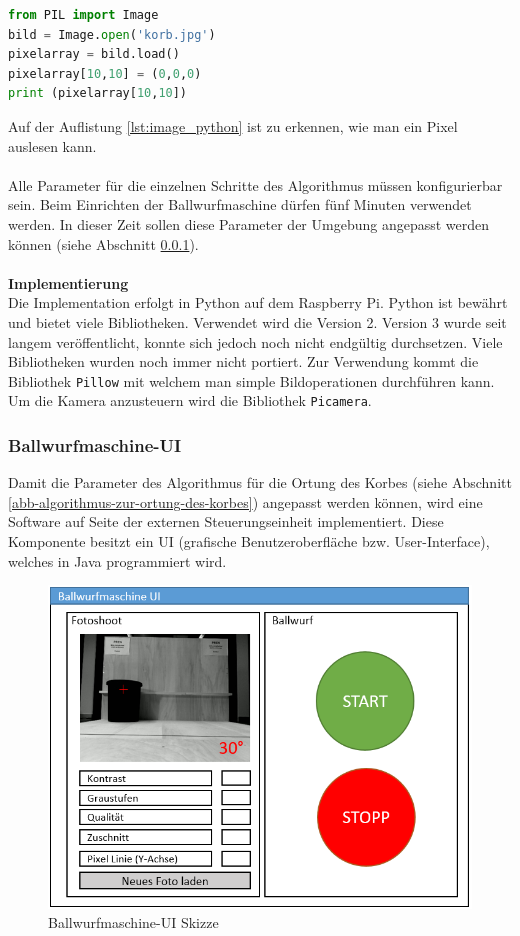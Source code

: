 \begin{lstlisting}[language=Python,caption={Pixel aus einem Bild auslesen mit Python},label=lst:image_python]
from PIL import Image
bild = Image.open('korb.jpg')
pixelarray = bild.load()
pixelarray[10,10] = (0,0,0)
print (pixelarray[10,10])
\end{lstlisting}

Auf der Auflistung \ref{lst:image_python} ist zu erkennen, wie man ein Pixel auslesen kann.\\
\\
Alle Parameter für die einzelnen Schritte des Algorithmus müssen konfigurierbar sein. Beim Einrichten der Ballwurfmaschine dürfen fünf Minuten verwendet werden. In dieser Zeit sollen diese Parameter der Umgebung angepasst werden können (siehe Abschnitt \ref{ss-config-paramater-ortung-orb}).\\
\\
\textbf{Implementierung}\\
Die Implementation erfolgt in Python auf dem Raspberry Pi. Python ist bewährt und bietet viele Bibliotheken. Verwendet wird die Version 2. Version 3 wurde seit langem veröffentlicht, konnte sich jedoch noch nicht endgültig durchsetzen. Viele Bibliotheken wurden noch immer nicht portiert. Zur Verwendung kommt die Bibliothek \verb|Pillow| mit welchem man simple Bildoperationen durchführen kann. Um die Kamera anzusteuern wird die Bibliothek \verb|Picamera|.

\subsubsection{Ballwurfmaschine-UI}
\label{ss-config-paramater-ortung-orb}
Damit die Parameter des Algorithmus für die Ortung des Korbes (siehe Abschnitt \ref{abb-algorithmus-zur-ortung-des-korbes}) angepasst werden können, wird eine Software auf Seite der externen Steuerungseinheit implementiert. Diese Komponente besitzt ein UI (grafische Benutzeroberfläche bzw. User-Interface), welches in Java programmiert wird.

\begin{figure}[h!]
	\centering
	\includegraphics[scale=0.75]{../../fig/fotoshoot-configurator.png}
	\caption{Ballwurfmaschine-UI Skizze}
\end{figure}

